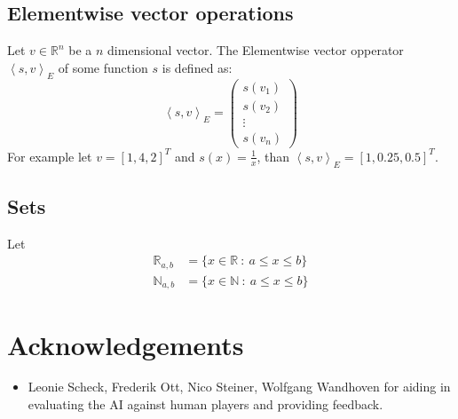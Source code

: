 \documentclass[12pt]{article}
\begin{document}
\subsection{Elementwise vector operations}
Let \(v \in \mathbb R^n\) be a \(n\) dimensional vector.
The Elementwise vector opperator \(\left<s, v\right>_{E}\) of some function \(s\) is defined as:
\begin{equation}\label{eq:vectorElemetwise}
\left<s, v\right>_E = \left(\begin{matrix}
s(v_1) \\
s(v_2) \\
\vdots\\
s(v_n)
\end{matrix}\right)
\end{equation}
For example let \(v = [1, 4, 2]^T\) and \(s(x) = \frac{1}{x}\), than \(\left<s, v\right>_E = [1, 0.25, 0.5]^T\).


\subsection{Sets}
Let
\begin{align}\label{set:Rab}
\mathbb R_{a, b} &= \{x \in \mathbb R~:~ a\leq x \leq b\}\\ \label{set:Nab}
\mathbb N_{a,b} & = \{x \in \mathbb N~:~a\leq x \leq b\}
\end{align}




\section*{Acknowledgements}
\begin{itemize}
\item Leonie Scheck, Frederik Ott, Nico Steiner, Wolfgang Wandhoven for aiding in evaluating the AI against human players and providing feedback.
\end{itemize}
\end{document}
